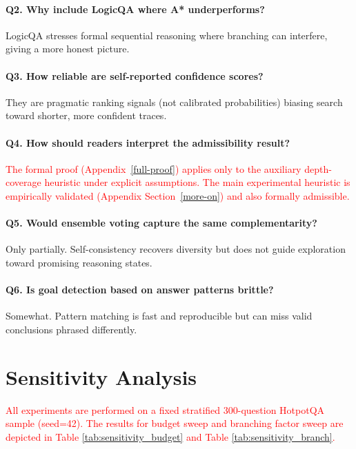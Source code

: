 \documentclass[11pt]{article}
\begin{document}
{\paragraph{Q2. Why include LogicQA where A* underperforms?}
LogicQA stresses formal sequential reasoning where branching can interfere, giving a more honest picture.

\paragraph{Q3. How reliable are self-reported confidence scores?}
They are pragmatic ranking signals (not calibrated probabilities) biasing search toward shorter, more confident traces.

\paragraph{Q4. How should readers interpret the admissibility result?}
\textcolor{red}{The formal proof (Appendix~\ref{full-proof}) applies only to the auxiliary depth-coverage heuristic under explicit assumptions. The main experimental heuristic is empirically validated (Appendix Section~\ref{more-on}) and also formally admissible.}

\paragraph{Q5. Would ensemble voting capture the same complementarity?}
Only partially. Self-consistency recovers diversity but does not guide exploration toward promising reasoning states.

\paragraph{Q6. Is goal detection based on answer patterns brittle?}
Somewhat. Pattern matching is fast and reproducible but can miss valid conclusions phrased differently.

\section{Sensitivity Analysis}
\label{app:sensitivity}

\textcolor{red}{All experiments are performed on a fixed stratified 300-question HotpotQA sample (seed=42). The results for budget sweep and branching factor sweep are depicted in Table \ref{tab:sensitivity_budget} and Table \ref{tab:sensitivity_branch}.}

}
\end{document}
